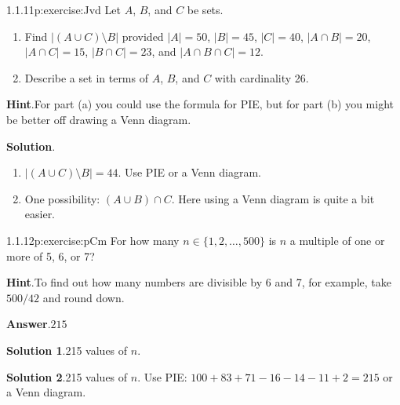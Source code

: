 \documentclass[twoside,11pt,]{book}
\newcommand{\blocktitlefont}{\relax}
\numberwithin{equation}{chapter}
\newcommand{\card}[1]{\left| #1 \right|}
\begin{document}
\begin{divisionsolution}{1.1.11}{}{p:exercise:Jvd}%
Let \(A\), \(B\), and \(C\) be sets.%
\begin{enumerate}[label=(\alph*)]
\item{}Find \(\card{(A \cup C)\setminus B}\) provided \(\card{A} = 50\), \(\card{B} = 45\), \(\card{C} = 40\), \(\card{A\cap B} = 20\), \(\card{A \cap C} = 15\), \(\card{B \cap C} = 23\), and \(\card{A \cap B \cap C} = 12\).%
\item{}Describe a set in terms of \(A\), \(B\), and \(C\) with cardinality 26.%
\end{enumerate}
%
\par\smallskip%
\noindent\textbf{\blocktitlefont Hint}.\quad{}For part (a) you could use the formula for PIE, but for part (b) you might be better off drawing a Venn diagram.%
\par\smallskip%
\noindent\textbf{\blocktitlefont Solution}.\quad{}%
\begin{enumerate}[label=(\alph*)]
\item{}\(\card{(A \cup C)\setminus B} = 44\). Use PIE or a Venn diagram.%
\item{}One possibility: \((A \cup B) \cap C\). Here using a Venn diagram is quite a bit easier.%
\end{enumerate}
%
\end{divisionsolution}%
\begin{divisionsolution}{1.1.12}{}{p:exercise:pCm}%
For how many \(n \in \{1,2, \ldots, 500\}\) is \(n\) a multiple of one or more of 5, 6, or 7?%
\par\smallskip%
\noindent\textbf{\blocktitlefont Hint}.\quad{}To find out how many numbers are divisible by 6 and 7, for example, take \(500/42\) and round down.%
\par\smallskip%
\noindent\textbf{\blocktitlefont Answer}.\quad{}\(215\)%
\par\smallskip%
\noindent\textbf{\blocktitlefont Solution 1}.\quad{}215 values of \(n\text{.}\)%
\par\smallskip%
\noindent\textbf{\blocktitlefont Solution 2}.\quad{}215 values of \(n\text{.}\) Use PIE: \(100 + 83 + 71 - 16 - 14 -11 + 2 = 215\) or a Venn diagram.%
\end{divisionsolution}%
\end{document}
